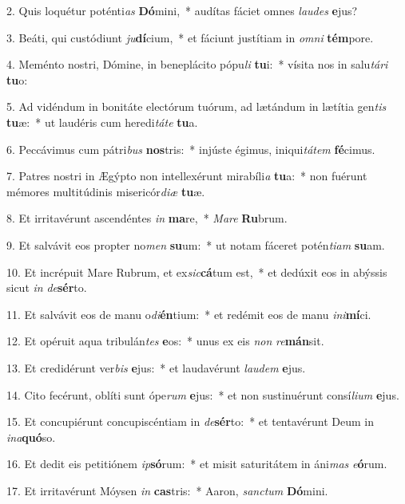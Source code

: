 2. Quis loquétur poténti\textit{as} \textbf{Dó}mini,~*  audítas fáciet omnes \textit{lau}\textit{des} \textbf{e}jus?\

3. Beáti, qui custódiunt \textit{ju}\textbf{dí}cium,~*  et fáciunt justítiam in \textit{om}\textit{ni} \textbf{tém}pore.\

4. Meménto nostri, Dómine, in beneplácito pópu\textit{li} \textbf{tu}i:~*  vísita nos in salu\textit{tá}\textit{ri} \textbf{tu}o:\

5. Ad vidéndum in bonitáte electórum tuórum, ad lætándum in lætítia gen\textit{tis} \textbf{tu}æ:~*  ut laudéris cum heredi\textit{tá}\textit{te} \textbf{tu}a.\

6. Peccávimus cum pátri\textit{bus} \textbf{nos}tris:~*  injúste égimus, iniqui\textit{tá}\textit{tem} \textbf{fé}cimus.\

7. Patres nostri in Ægýpto non intellexérunt mirabíli\textit{a} \textbf{tu}a:~*  non fuérunt mémores multitúdinis misericór\textit{di}\textit{æ} \textbf{tu}æ.\

8. Et irritavérunt ascendéntes \textit{in} \textbf{ma}re,~*  \textit{Ma}\textit{re} \textbf{Ru}brum.\

9. Et salvávit eos propter no\textit{men} \textbf{su}um:~*  ut notam fáceret potén\textit{ti}\textit{am} \textbf{su}am.\

10. Et incrépuit Mare Rubrum, et ex\textit{sic}\textbf{cá}tum est,~*  et dedúxit eos in abýssis sicut \textit{in} \textit{de}\textbf{sér}to.\

11. Et salvávit eos de manu o\textit{di}\textbf{én}tium:~*  et redémit eos de manu \textit{in}\textit{i}\textbf{mí}ci.\

12. Et opéruit aqua tribulán\textit{tes} \textbf{e}os:~*  unus ex eis \textit{non} \textit{re}\textbf{mán}sit.\

13. Et credidérunt ver\textit{bis} \textbf{e}jus:~*  et laudavérunt \textit{lau}\textit{dem} \textbf{e}jus.\

14. Cito fecérunt, oblíti sunt ópe\textit{rum} \textbf{e}jus:~*  et non sustinuérunt consí\textit{li}\textit{um} \textbf{e}jus.\

15. Et concupiérunt concupiscéntiam in \textit{de}\textbf{sér}to:~*  et tentavérunt Deum in \textit{in}\textit{a}\textbf{quó}so.\

16. Et dedit eis petitiónem \textit{ip}\textbf{só}rum:~*  et misit saturitátem in áni\textit{mas} \textit{e}\textbf{ó}rum.\

17. Et irritavérunt Móysen \textit{in} \textbf{cas}tris:~*  Aaron, \textit{sanc}\textit{tum} \textbf{Dó}mini.\

